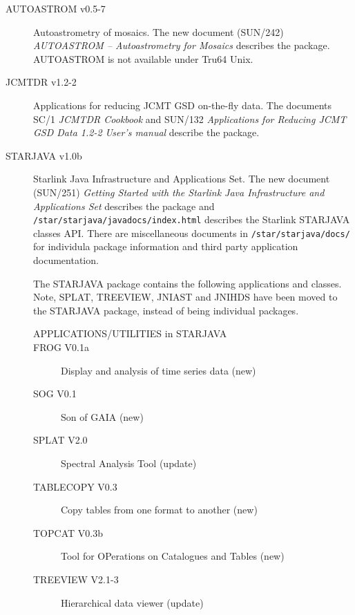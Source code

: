 \documentclass[twoside,11pt]{article}
\newcommand{\xref}[3]{#1}
\renewcommand{\_}{\texttt{\symbol{95}}}
\begin{document}
\begin{description}


\item[AUTOASTROM v0.5-7] Autoastrometry of mosaics. The new document (SUN/242)
\textit{\xref{AUTOASTROM -- Autoastrometry for Mosaics}{sun242}{}\/}
describes the package. AUTOASTROM is not available under Tru64 Unix.

\item[JCMTDR v1.2-2] Applications for reducing JCMT GSD on-the-fly data.
The documents SC/1 \textit{\xref{JCMTDR Cookbook}{sc1}{}\/} and
SUN/132 \textit{\xref{Applications for Reducing JCMT GSD Data 1.2-2 User's manual}{sun132}{}\/}
describe the package.

\item[STARJAVA v1.0b] Starlink Java Infrastructure and Applications Set.
The new document (SUN/251)
\textit{\xref{Getting Started with the Starlink Java Infrastructure
and Applications Set}{sun251}{}\/}
describes the package and \texttt{/star/starjava/javadocs/index.html}
describes the Starlink STARJAVA classes API. There are miscellaneous
documents in \texttt{/star/starjava/docs/} for individula package information and
third party application documentation.

The STARJAVA package contains the following applications and classes. Note,
SPLAT, TREEVIEW, JNIAST and JNIHDS have been moved to the STARJAVA
package, instead of being individual packages.

\begin{description}
\item[APPLICATIONS/UTILITIES in STARJAVA]
\item[ FROG V0.1a] Display and analysis of time series data (new)
\item[ SOG V0.1] Son of GAIA (new)
\item[ SPLAT V2.0] Spectral Analysis Tool (update)
\item[ TABLECOPY V0.3] Copy tables from one format to another (new)
\item[ TOPCAT V0.3b] Tool for OPerations on Catalogues and Tables (new)
\item[ TREEVIEW V2.1-3] Hierarchical data viewer (update)


\end{description}
\end{description}
\end{document}

